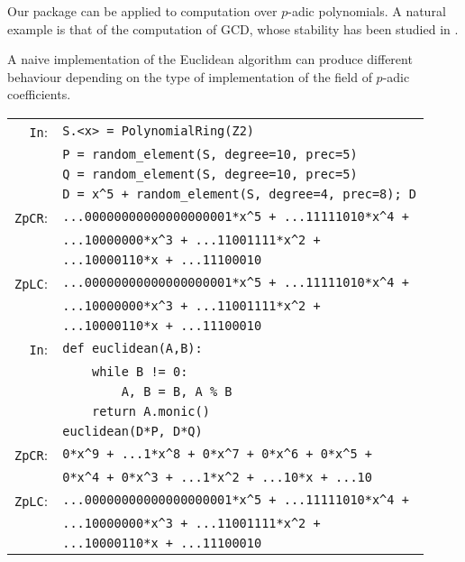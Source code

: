\documentclass[sigconf]{acmart}
\newcommand{\cIn}{{\color{input} \tt \phantom{Zp}In}:}
\newcommand{\cZpCR}{{\color{output} \tt ZpCR}:}
\newcommand{\cZpLC}{{\color{output} \tt ZpLC}:}
\theoremstyle{definition}
\begin{document}
Our package can be applied to computation over $p$-adic polynomials. A 
natural example is that of the computation of GCD, whose stability has 
been studied in \cite{caruso-2017}.

A naive implementation of the Euclidean algorithm
can produce different behaviour depending 
on the type of implementation of the field
of $p$-adic coefficients.

\smallskip

{\noindent \small
\begin{tabular}{@{}rl}
\cIn
 & \verb?S.<x> = ?{\color{constructor}\verb?PolynomialRing?}\verb?(?{\color{ring}\verb?Z2?}\verb?)? \\
 & \verb?P = ?{\color{function}\verb?random_element?}\verb?(S, degree=10, prec=5)? \\
 & \verb?Q = ?{\color{function}\verb?random_element?}\verb?(S, degree=10, prec=5)? \\
 & \verb?D = x^5 + ?{\color{function}\verb?random_element?}\verb?(S, degree=4, prec=8); D? \\
\cZpCR
 & \verb?...00000000000000000001*x^5 + ...11111010*x^4 +? \\ 
 & \verb?...10000000*x^3 + ...11001111*x^2 +? \\
 & \verb?...10000110*x + ...11100010? \\
\cZpLC
 & \verb?...00000000000000000001*x^5 + ...11111010*x^4 +? \\ 
 & \verb?...10000000*x^3 + ...11001111*x^2 +? \\
 & \verb?...10000110*x + ...11100010? \\
\cIn
 & {\color{keyword}\verb?def?}\verb? ?{\color{function}\verb?euclidean?}\verb?(A,B):? \\
 & \verb?    ?{\color{keyword}\verb?while?}\verb? B != 0:? \\
 & \verb?        A, B = B, A % B? \\
 & \verb?    ?{\color{keyword}\verb?return?}\verb? A.monic()? \\
 & {\color{function}\verb?euclidean?}\verb?(D*P, D*Q)? \\
\cZpCR
 & \verb?0*x^9 + ...1*x^8 + 0*x^7 + 0*x^6 + 0*x^5 +? \\
 & \verb?0*x^4 + 0*x^3 + ...1*x^2 + ...10*x + ...10? \\
\cZpLC
 & \verb?...00000000000000000001*x^5 + ...11111010*x^4 +? \\ 
 & \verb?...10000000*x^3 + ...11001111*x^2 +? \\
 & \verb?...10000110*x + ...11100010? \\
\end{tabular}}
\end{document}
